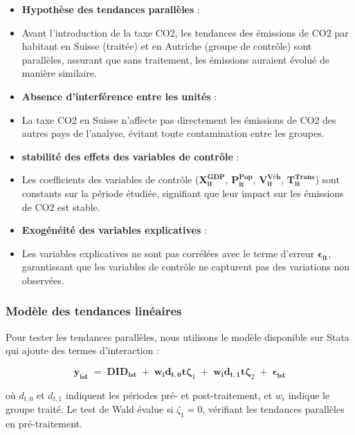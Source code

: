 \begin{itemize}
    \item[] \textbf{Hypothèse des tendances parallèles} : 
    \item[] Avant l'introduction de la taxe CO2, les tendances des émissions de CO2 par habitant en Suisse (traitée) et en Autriche (groupe de contrôle) sont parallèles, assurant que sans traitement, les émissions auraient évolué de manière similaire.
    
    \item[] \textbf{Absence d'interférence entre les unités} : 
    \item[] La taxe CO2 en Suisse n'affecte pas directement les émissions de CO2 des autres pays de l'analyse, évitant toute contamination entre les groupes.
    
    \item[] \textbf{stabilité des effets des variables de contrôle} : 
    \item[] Les coefficients des variables de contrôle ($\mathbf{X_{it}^{GDP}}$, $\mathbf{P_{it}^{Pop}}$, $\mathbf{V_{it}^{Véh}}$, $\mathbf{T_{it}^{Trans}}$) sont constants sur la période étudiée, signifiant que leur impact sur les émissions de CO2 est stable.
    
    \item[] \textbf{Exogénéité des variables explicatives} : 
    \item[] Les variables explicatives ne sont pas corrélées avec le terme d'erreur $\mathbf{\epsilon_{it}}$, garantissant que les variables de contrôle ne capturent pas des variations non observées.
\end{itemize}

\subsubsection{Modèle des tendances linéaires}
\label{subsubsec:strategie_linear_trend_method}

Pour tester les tendances parallèles, nous utilisons le modèle disponible sur Stata \supercite{stata_didregress} qui ajoute des termes d'interaction :

$$
\mathbf{y_{ist}} \; = \;  \mathbf{DID_{ist}} \;  +\;   \mathbf{w_i} \mathbf{d_{t,0}} \mathbf{t} \boldsymbol{\zeta}_1 \;  + \;  \mathbf{w_i} \mathbf{d_{t,1}} \mathbf{t} \boldsymbol{\zeta}_2 \;  +\;  \boldsymbol{\epsilon_{ist}}
$$

où $d_{t,0}$ et $d_{t,1}$ indiquent les périodes pré- et post-traitement, et $w_i$ indique le groupe traité. Le test de Wald évalue si $\zeta_1 = 0$, vérifiant les tendances parallèles en pré-traitement.

